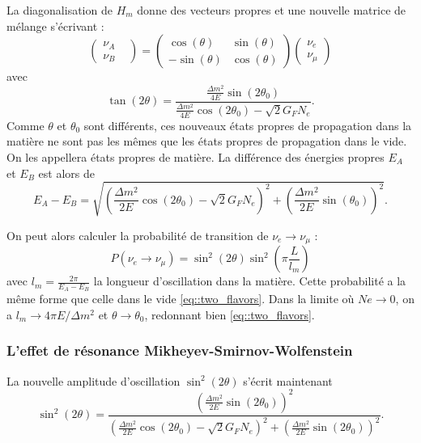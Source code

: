             La diagonalisation de $H_m$ donne des vecteurs propres et une nouvelle matrice de mélange s'écrivant :
            \begin{equation}
                 \left(\begin{matrix}\nu_A & \\ \nu_B\end{matrix}\right) = \left(\begin{matrix}\cos(\theta) & \sin(\theta) \\ -\sin(\theta) & \cos(\theta)\end{matrix}\right)\left(\begin{matrix}\nu_e \\ \nu_{\mu}\end{matrix}\right)
            \end{equation}
            avec 
            \begin{equation}\label{eq::tan2theta}
                \tan(2\theta)=\frac{\frac{\Delta m^2}{4E}\sin(2\theta_0)}{\frac{\Delta m^2}{4E}\cos(2\theta_0)-\sqrt{2}G_F N_e}.
            \end{equation}
            Comme $\theta$ et $\theta_0$ sont différents, ces nouveaux états propres de propagation dans la matière ne sont pas les mêmes que les états propres de propagation dans le vide. On les appellera états propres de matière. La différence des énergies propres $E_A$ et $E_B$ est alors de 
            \begin{equation}
                E_A - E_B = \sqrt{\left(\frac{\Delta m^2}{2E}\cos(2\theta_0)-\sqrt{2}G_F N_e\right)^2 + \left(\frac{\Delta m^2}{2E}\sin(\theta_0)\right)^2}.
            \end{equation}
            
            On peut alors calculer la probabilité de transition de  $\nu_e\to\nu_{\mu}$ : 
            \begin{equation}\label{eq::two_flavors_matter}
                P(\nu_e\to\nu_{\mu}) = \sin^2(2\theta)\sin^2\left(\pi\frac{L}{l_m}\right)
            \end{equation}
            avec $l_m=\frac{2\pi}{E_A-E_B}$ la longueur d'oscillation dans la matière. Cette probabilité a la même forme que celle dans le vide \eqref{eq::two_flavors}. Dans la limite où $Ne\to 0$, on a $l_m\to 4\pi E/\Delta m^2$ et $\theta \to \theta_0$, redonnant bien \eqref{eq::two_flavors}.
            
            \subsubsection{L'effet de résonance Mikheyev-Smirnov-Wolfenstein}
            La nouvelle amplitude d'oscillation $\sin^2(2\theta)$ s'écrit maintenant
            \begin{equation}
                \sin^2(2\theta) = \frac{\left(\frac{\Delta m^2}{2E}\sin(2\theta_0)\right)^2}{\left(\frac{\Delta m^2}{2E}\cos(2\theta_0) - \sqrt{2}G_F N_e\right)^2 + \left(\frac{\Delta m^2}{2E}\sin(2\theta_0)\right)^2}.
            \end{equation}
            
